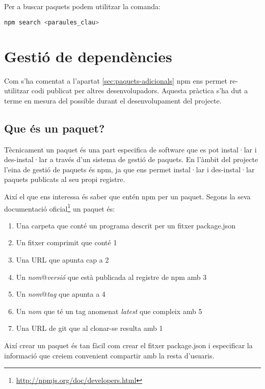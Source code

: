 Per a buscar paquets podem utilitzar la comanda: 

\begin{lstlisting}[language=bash]
npm search <paraules_clau>
\end{lstlisting}

\section{Gestió de dependències}
\label{sec:gestio-dependencies}
Com s'ha comentat a l'apartat \ref{sec:paquets-adicionals} npm ens permet re-utilitzar codi publicat per altres desenvolupadors. Aquesta pràctica s'ha dut a terme en mesura del possible durant el desenvolupament del projecte.  

\subsection{Que és un paquet?}
\label{sec:que-es-un-paquet}

Tècnicament un paquet és una part especifica de software que es pot instal·lar i des-instal·lar a través d'un sistema de gestió de paquets. En l'àmbit del projecte l'eina de gestió de paquets és npm, ja que ens permet instal·lar i des-instal·lar paquets publicats al seu propi registre. 

Així el que ens interessa és saber que entén npm per un paquet. Segons la seva documentació oficial\footnote{\url{http://npmjs.org/doc/developers.html}} un paquet és: 

\begin{enumerate}
\item {Una carpeta que conté un programa descrit per un fitxer package.json}
\item {Un fitxer comprimit que conté 1}
\item {Una URL que apunta cap a 2}
\item {Un \emph{nom}@\emph{versió} que està publicada al registre de npm amb 3}
\item {Un \emph{nom}@\emph{tag} que apunta a 4}
\item {Un \emph{nom} que té un tag anomenat \emph{latest} que compleix amb 5}
\item {Una URL de git que al clonar-se resulta amb 1}
\end{enumerate}

Així crear un paquet és tan fàcil com crear el fitxer package.json i especificar la informació que creiem convenient compartir amb la resta d'usuaris. 

